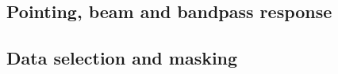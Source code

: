 \documentclass{aa}
\def\COBE{\textit{COBE}}
\begin{document}

% 




\subsection{Pointing, beam and bandpass response}




\subsection{Data selection and masking}
\end{document}
